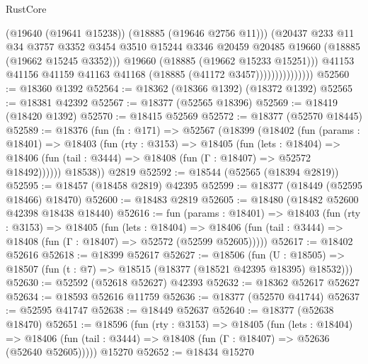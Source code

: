 \begin{lexlean}{RustCore}
\begin{coremodule}
                                  (@19640 (@19641 @15238))
                                  (@18885 (@19646 @2756 @11)))
                                (@20437
                                  @233
                                  @11
                                  @34
                                  @3757
                                  @3352
                                  @3454
                                  @3510
                                  @15244
                                  @3346
                                  @20459
                                  @20485
                                  @19660
                                  (@18885 (@19662 @15245 @3352)))
                                @19660
                                (@18885 (@19662 @15233 @15251)))
                              @41153
                              @41156
                              @41159
                              @41163
                              @41168
                              (@18885 (@41172 @3457)))))))))))))))
@52560 := @18360 @1392
@52564 := @18362 (@18366 @1392) (@18372 @1392)
@52565 := @18381 @42392
@52567 := @18377 (@52565 @18396)
@52569 := @18419 (@18420 @1392)
@52570 := @18415 @52569
@52572 := @18377 (@52570 @18445)
@52589 := @18376
    (fun (fn : @171) =>
    @52567
      (@18399
        (@18402
          (fun (params : @18401) =>
          @18403
            (fun (rty : @3153) =>
            @18405
              (fun (lets : @18404) =>
              @18406 (fun (tail : @3444) => @18408 (fun (Γ : @18407) => @52572 @18492))))))
        @18538))
    @2819
@52592 := @18544 (@52565 (@18394 @2819))
@52595 := @18457 (@18458 @2819) @42395
@52599 := @18377 (@18449 (@52595 @18466) @18470)
@52600 := @18483 @2819
@52605 := @18480 (@18482 @52600 @42398 @18438 @18440)
@52616 := fun (params : @18401) =>
  @18403
    (fun (rty : @3153) =>
    @18405
      (fun (lets : @18404) =>
      @18406 (fun (tail : @3444) => @18408 (fun (Γ : @18407) => @52572 (@52599 @52605)))))
@52617 := @18402 @52616
@52618 := @18399 @52617
@52627 := @18506
    (fun (U : @18505) => @18507 (fun (t : @7) => @18515 (@18377 (@18521 @42395 @18395) @18532)))
@52630 := @52592 (@52618 @52627) @42393
@52632 := @18362 @52617 @52627
@52634 := @18593 @52616 @11759
@52636 := @18377 (@52570 @41744)
@52637 := @52595 @41747
@52638 := @18449 @52637
@52640 := @18377 (@52638 @18470)
@52651 := @18596
    (fun (rty : @3153) =>
    @18405
      (fun (lets : @18404) =>
      @18406 (fun (tail : @3444) => @18408 (fun (Γ : @18407) => @52636 (@52640 @52605)))))
    @15270
@52652 := @18434 @15270

\end{coremodule}
\end{lexlean}
